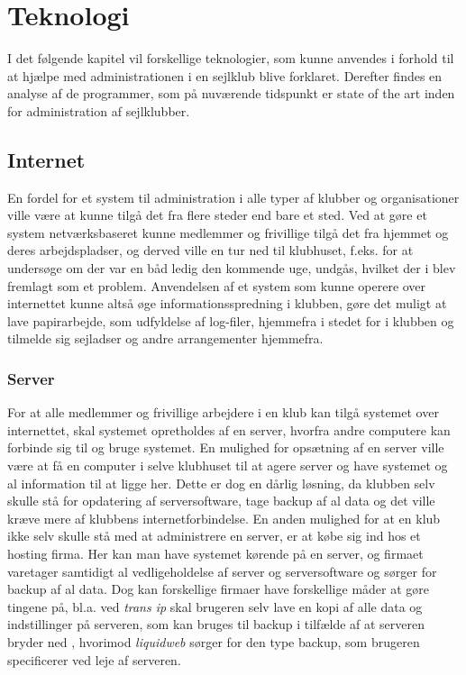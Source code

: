 \chapter{Teknologi}\label{chap:teknologi-analyse}

I det følgende kapitel vil forskellige teknologier, som kunne anvendes i forhold til at hjælpe med administrationen i en
sejlklub blive forklaret. Derefter findes en analyse af de programmer, som på nuværende tidspunkt er state of the art
inden for administration af sejlklubber.


\section{Internet}
En fordel for et system til administration i alle typer af klubber og organisationer ville være at kunne tilgå det fra
flere steder end bare et sted. Ved at gøre et system netværksbaseret kunne medlemmer og frivillige tilgå det fra hjemmet
og deres arbejdspladser, og derved ville en tur ned til klubhuset, f.eks. for at undersøge om der var en båd ledig den
kommende uge, undgås, hvilket der i  blev fremlagt som et problem. Anvendelsen
af et system som kunne operere over internettet kunne altså øge informationsspredning i klubben, gøre det muligt at lave
papirarbejde, som udfyldelse af log-filer, hjemmefra i stedet for i klubben og tilmelde sig sejladser og andre arrangementer
hjemmefra.


\subsection*{Server}

For at alle medlemmer og frivillige arbejdere i en klub kan tilgå systemet over internettet, skal systemet opretholdes
af en server, hvorfra andre computere kan forbinde sig til og bruge systemet. En mulighed for opsætning af en server
ville være at få en computer i selve klubhuset til at agere server og have systemet og al information til at ligge her.
Dette er dog en dårlig løsning, da klubben selv skulle stå for opdatering af serversoftware, tage backup af al data og
det ville kræve mere af klubbens internetforbindelse. En anden mulighed for at en klub ikke selv skulle stå med at
administrere en server, er at købe sig ind hos et hosting firma. Her kan man have systemet kørende på en server, og firmaet
varetager samtidigt al vedligeholdelse af server og serversoftware og sørger for backup af al data. Dog kan forskellige
firmaer have forskellige måder at gøre tingene på, bl.a. ved \textit{trans ip} skal brugeren selv lave en kopi af alle
data og indstillinger på serveren, som kan bruges til backup i tilfælde af at serveren bryder ned \citep{Virtuelserver},
hvorimod \textit{liquidweb} \citep{liquid} sørger for den type backup, som brugeren specificerer ved leje af serveren.


